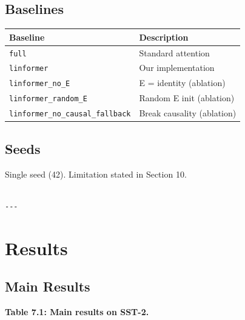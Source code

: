 \subsection{Baselines}

\begin{table}[H]
\centering
\small
\begin{tabular}{ll}
\toprule
\textbf{Baseline} & \textbf{Description} \\
\midrule
\texttt{full} & Standard attention \\
\texttt{linformer} & Our implementation \\
\texttt{linformer\_no\_E} & E = identity (ablation) \\
\texttt{linformer\_random\_E} & Random E init (ablation) \\
\texttt{linformer\_no\_causal\_fallback} & Break causality (ablation) \\
\bottomrule
\end{tabular}
\end{table}

\subsection{Seeds}

Single seed (42). Limitation stated in Section 10.
\begin{lstlisting}

---
\end{lstlisting}

\section{Results}

\subsection{Main Results}

\textbf{Table 7.1: Main results on SST-2.}


